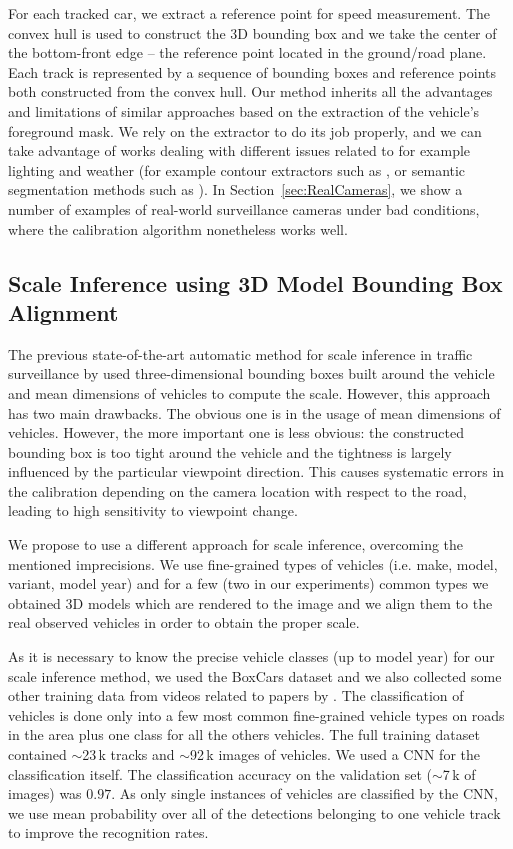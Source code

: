 \documentclass[]{elsarticle}
\begin{document}
For each tracked car, we extract a reference point for speed measurement. The convex hull is used to construct the 3D bounding box \citep{Dubska2014} and we take the center of the bottom-front edge -- the reference point located in the ground/road plane. Each track is represented by a sequence of bounding boxes and reference points both constructed from the convex hull.
Our method inherits all the advantages and limitations of similar approaches based on the extraction of the vehicle's foreground mask.  We rely on the extractor to do its job properly, and we can take advantage of works dealing with different issues related to for example lighting and weather (for example contour extractors such as \cite{Yang_2016_CVPR}, or semantic segmentation methods such as \cite{Long_2015_CVPR}). In Section~\ref{sec:RealCameras}, we show a number of examples of real-world surveillance cameras under bad conditions, where the calibration algorithm nonetheless works well.



\subsection{Scale Inference using 3D Model Bounding Box Alignment} \label{sec:ScaleInference}
The previous state-of-the-art automatic method for scale inference in traffic surveillance by \cite{Dubska2014} used three-dimensional bounding boxes built around the vehicle and mean dimensions of vehicles to compute the scale. However, this approach has two main drawbacks. The obvious one is in the usage of mean dimensions of vehicles. 
However, the more important one is less obvious: the constructed bounding box is too tight around the vehicle and the tightness is largely influenced by the particular viewpoint direction.  This causes systematic errors in the calibration depending on the camera location with respect to the road, leading to high sensitivity to viewpoint change.

We propose to use a different approach for scale inference, overcoming the mentioned imprecisions.  We use fine-grained types of vehicles (i.e. make, model, variant, model year) and for a few (two in our experiments) common types we obtained 3D models which are rendered to the image and we align them to the real observed vehicles in order to obtain the proper scale.

As it is necessary to know the precise vehicle classes (up to model year) for our scale inference method, we used the BoxCars dataset \citep{Sochor2016} and we also collected some other training data from videos related to papers by \cite{Dubska2014,Dubska2015ITS}.
The classification of vehicles is done only into a few most common fine-grained vehicle types on roads in the area plus one class for all the others vehicles. The full training dataset contained $\sim$23\,k  tracks and $\sim$92\,k images of vehicles. We used a CNN \citep{Krizhevsky2012} for the classification itself. The classification accuracy on the validation set ($\sim$7\,k of images) was $0.97$. As only single instances of vehicles are classified by the CNN, we use mean probability over all of the detections belonging to one vehicle track to improve the recognition rates.
\end{document}
